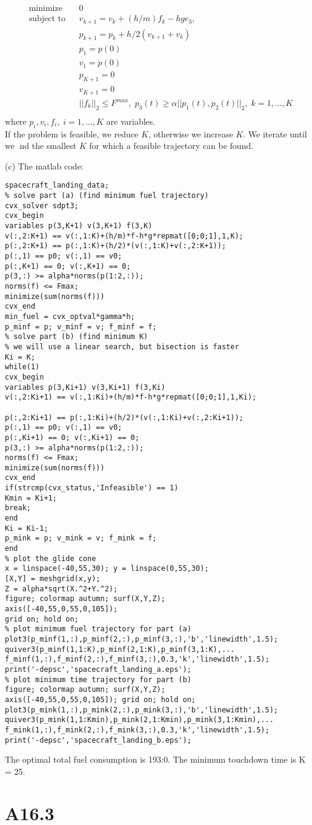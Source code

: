 \documentclass{article}
\begin{document}
\begin{align*}
	&\text{minimize} && 0\\
	&\text{subject to} 
	&&v_{k + 1} = v_{k} + (h / m) f_k- hge_3, \\
	& &&p_{k + 1} = p_k + h / 2 (v_{k + 1} + v_k)\\
	& && p_1 = p(0) \\
	& && v_1 = \dot{p}(0)\\
	& &&p_{K + 1} = 0 \\
	& && v_{K + 1} = 0 \\
	& && ||f_k||_2 \leq F^{max}, \; 
	p_3(t) \geq \alpha ||p_1(t), p_2(t)||_2, 
	\; k = 1, \dots, K\\
\end{align*} 
where $p_i, v_i, f_i, \; i = 1, \dots, K$ are variables.\\
If the problem is feasible, we reduce $K$, otherwise we increase $K$. We iterate until we nd the smallest $K$ for which a feasible trajectory can be found.

(c) The matlab code:

\begin{verbatim}
spacecraft_landing_data;
% solve part (a) (find minimum fuel trajectory)
cvx_solver sdpt3;
cvx_begin
variables p(3,K+1) v(3,K+1) f(3,K)
v(:,2:K+1) == v(:,1:K)+(h/m)*f-h*g*repmat([0;0;1],1,K);
p(:,2:K+1) == p(:,1:K)+(h/2)*(v(:,1:K)+v(:,2:K+1));
p(:,1) == p0; v(:,1) == v0;
p(:,K+1) == 0; v(:,K+1) == 0;
p(3,:) >= alpha*norms(p(1:2,:));
norms(f) <= Fmax;
minimize(sum(norms(f)))
cvx_end
min_fuel = cvx_optval*gamma*h;
p_minf = p; v_minf = v; f_minf = f;
% solve part (b) (find minimum K)
% we will use a linear search, but bisection is faster
Ki = K;
while(1)
cvx_begin
variables p(3,Ki+1) v(3,Ki+1) f(3,Ki)
v(:,2:Ki+1) == v(:,1:Ki)+(h/m)*f-h*g*repmat([0;0;1],1,Ki);

p(:,2:Ki+1) == p(:,1:Ki)+(h/2)*(v(:,1:Ki)+v(:,2:Ki+1));
p(:,1) == p0; v(:,1) == v0;
p(:,Ki+1) == 0; v(:,Ki+1) == 0;
p(3,:) >= alpha*norms(p(1:2,:));
norms(f) <= Fmax;
minimize(sum(norms(f)))
cvx_end
if(strcmp(cvx_status,'Infeasible') == 1)
Kmin = Ki+1;
break;
end
Ki = Ki-1;
p_mink = p; v_mink = v; f_mink = f;
end
% plot the glide cone
x = linspace(-40,55,30); y = linspace(0,55,30);
[X,Y] = meshgrid(x,y);
Z = alpha*sqrt(X.^2+Y.^2);
figure; colormap autumn; surf(X,Y,Z);
axis([-40,55,0,55,0,105]);
grid on; hold on;
% plot minimum fuel trajectory for part (a)
plot3(p_minf(1,:),p_minf(2,:),p_minf(3,:),'b','linewidth',1.5);
quiver3(p_minf(1,1:K),p_minf(2,1:K),p_minf(3,1:K),...
f_minf(1,:),f_minf(2,:),f_minf(3,:),0.3,'k','linewidth',1.5);
print('-depsc','spacecraft_landing_a.eps');
% plot minimum time trajectory for part (b)
figure; colormap autumn; surf(X,Y,Z);
axis([-40,55,0,55,0,105]); grid on; hold on;
plot3(p_mink(1,:),p_mink(2,:),p_mink(3,:),'b','linewidth',1.5);
quiver3(p_mink(1,1:Kmin),p_mink(2,1:Kmin),p_mink(3,1:Kmin),...
f_mink(1,:),f_mink(2,:),f_mink(3,:),0.3,'k','linewidth',1.5);
print('-depsc','spacecraft_landing_b.eps');	
\end{verbatim}	

The optimal total fuel consumption is 193:0. The minimum touchdown
time is K = 25.


\section*{A16.3}


\end{document}

